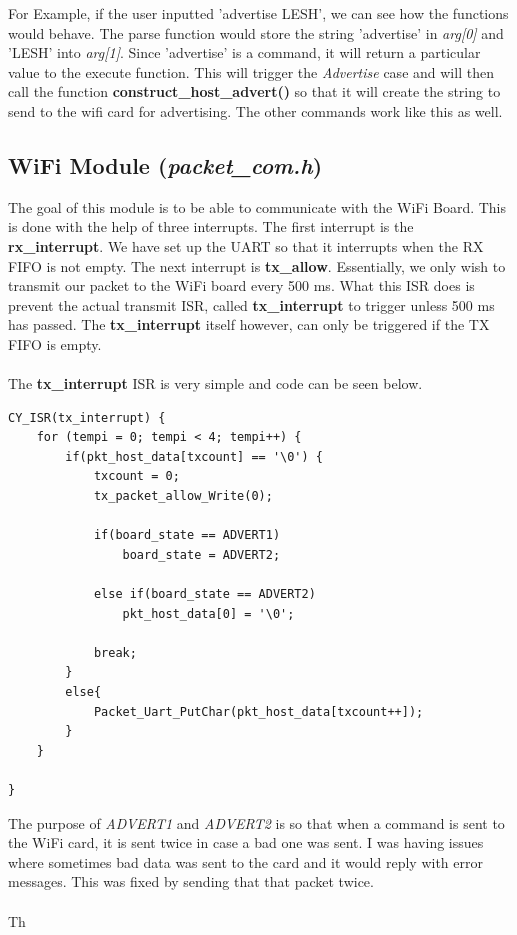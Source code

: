 \documentclass[a4paper, 12pt]{article}
\begin{document}
    For Example, if the user inputted 'advertise LESH', we can see how the 
    functions would behave. The parse function would store the string 
    'advertise' in \textit{arg[0]} and 'LESH' into \textit{arg[1]}. Since
    'advertise' is a command, it will return a particular value to the execute
    function. This will trigger the \textit{Advertise} case and will then
    call the function \textbf{construct\_host\_advert()} so that it will
    create the string to send to the wifi card for advertising. The other
    commands  work like this as well.

    \subsection{WiFi Module (\textit{packet\_com.h})}

    The goal of this module is to be able to communicate with the WiFi Board.
    This is done with the help of three interrupts. The first interrupt is the
    \textbf{rx\_interrupt}. We have set up the UART so that it interrupts when
    the RX FIFO is not empty. The next interrupt is \textbf{tx\_allow}. Essentially,
    we only wish to transmit our packet to the WiFi board every 500 ms. What this
    ISR does is prevent the actual transmit ISR, called \textbf{tx\_interrupt}
    to trigger unless 500 ms has passed. The \textbf{tx\_interrupt} itself
    however, can only be triggered if the TX FIFO is empty.
    \\ \\
    The \textbf{tx\_interrupt} ISR is very simple and code can be seen below.

    \begin{verbatim}
CY_ISR(tx_interrupt) {
    for (tempi = 0; tempi < 4; tempi++) {
        if(pkt_host_data[txcount] == '\0') {
            txcount = 0;
            tx_packet_allow_Write(0);
            
            if(board_state == ADVERT1)
                board_state = ADVERT2;
            
            else if(board_state == ADVERT2)
                pkt_host_data[0] = '\0';
            
            break;
        }
        else{
            Packet_Uart_PutChar(pkt_host_data[txcount++]);
        } 
    }
    
}
    \end{verbatim}

    The purpose of \textit{ADVERT1} and \textit{ADVERT2} is so that when a
    command is sent to the WiFi card, it is sent twice in case a bad one was
    sent. I was having issues where sometimes bad data was sent to the card
    and it would reply with error messages. This was fixed by sending that
    that packet twice.
    \\ \\

    Th
\end{document}

